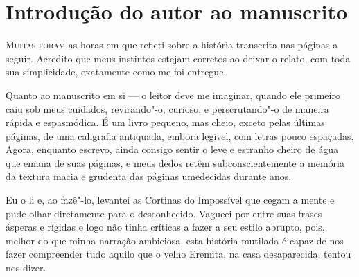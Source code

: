 %
%
%


\chapter{Introdução do autor ao manuscrito}

\textsc{Muitas foram} as horas em que refleti sobre a história transcrita nas páginas a seguir. Acredito que meus instintos estejam
corretos ao deixar o relato, com toda sua simplicidade, exatamente como me foi entregue.
                                                       
Quanto ao manuscrito em si --- o leitor deve me imaginar, quando ele primeiro caiu sob meus cuidados, revirando"-o,
curioso, e perscrutando"-o de maneira rápida e espasmódica. É um livro pequeno, mas cheio, exceto pelas últimas páginas,
de uma caligrafia antiquada, embora legível, com letras pouco espaçadas. Agora, enquanto escrevo, ainda consigo sentir
o leve e estranho cheiro de água que emana de suas páginas, e meus dedos retêm subconscientemente a memória da textura
macia e grudenta das páginas umedecidas durante anos.

Eu o li e, ao fazê"-lo, levantei as Cortinas do Impossível que cegam a mente e pude olhar diretamente para o
desconhecido. Vagueei por entre suas frases ásperas e rígidas e logo não tinha críticas a fazer a seu estilo abrupto,
pois, melhor do que minha narração ambiciosa, esta história mutilada é capaz de nos fazer compreender tudo
aquilo que o velho Eremita, na casa desaparecida, tentou nos dizer.

